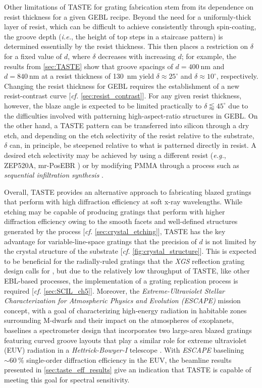 Other limitations of TASTE for grating fabrication stem from its dependence on resist thickness for a given GEBL recipe. 
Beyond the need for a uniformly-thick layer of resist, which can be difficult to achieve consistently through spin-coating, the groove depth (\emph{i.e.}, the height of top steps in a staircase pattern) is determined essentially by the resist thickness. 
This then places a restriction on $\delta$ for a fixed value of $d$, where $\delta$ decreases with increasing $d$; for example, the results from \cref{sec:TASTE} show that groove spacings of $d = \SI{400}{\nm}$ and $d = \SI{840}{\nm}$ at a resist thickness of \SI{130}{\nm} yield $\delta \approx 25^{\circ}$ and $\delta \approx 10^{\circ}$, respectively. 
Changing the resist thickness for GEBL requires the establishment of a new resist-contrast curve [\emph{cf.\@} \cref{sec:resist_contrast}]. 
For any given resist thickness, however, the blaze angle is expected to be limited practically to $\delta \lessapprox 45^{\circ}$ due to the difficulties involved with patterning high-aspect-ratio structures in GEBL. 
On the other hand, a TASTE pattern can be transferred into silicon through a dry etch, and depending on the etch selectivity of the resist relative to the substrate, $\delta$ can, in principle, be steepened relative to what is patterned directly in resist. 
A desired etch selectivity may be achieved by using a different resist (\emph{e.g.}, ZEP520A, mr-PosEBR \cite{Kirchner16,Pfirrmann16}) or by modifying PMMA  through a process such as \emph{sequential infiltration synthesis} \cite{Tseng11}. 

Overall, TASTE provides an alternative approach to fabricating blazed gratings that perform with high diffraction efficiency at soft x-ray wavelengths. 
While  etching may be capable of producing gratings that perform with higher diffraction efficiency owing to the smooth facets and well-defined structures generated by the process [\emph{cf.\@} \cref{sec:crystal_etching}], TASTE has the key advantage for variable-line-space gratings that the precision of $d$ is not limited by the crystal structure of the substrate [\emph{cf.\@} \cref{fig:crystal_structure}]. 
This is expected to be beneficial for the radially-ruled gratings that the \emph{XGS} reflection grating design calls for \cite{McEntaffer19}, but due to the relatively low throughput of TASTE, like other EBL-based processes, the implementation of a grating replication process is required [\emph{cf.\@} \cref{sec:SCIL_ch5}]. 
Moreover, the \emph{Extreme-Ultraviolet Stellar Characterization for Atmospheric Physics and Evolution (ESCAPE)} mission concept, with a goal of characterizing high-energy radiation in habitable zones surrounding M-dwarfs and their impact on the atmospheres of exoplanets, baselines a spectrometer design that incorporates two large-area blazed gratings featuring curved groove layouts that play a similar role for extreme ultraviolet (EUV) radiation in a \emph{Hettrick-Bowyer-I} telescope \cite{France19,France20,Hettrick84}. 
With \emph{ESCAPE} baselining $\sim \SI{60}{\percent}$ single-order diffraction efficiency in the EUV, the beamline results presented in \cref{sec:taste_eff_results} give an indication that TASTE is capable of meeting this goal for spectral sensitivity. 

